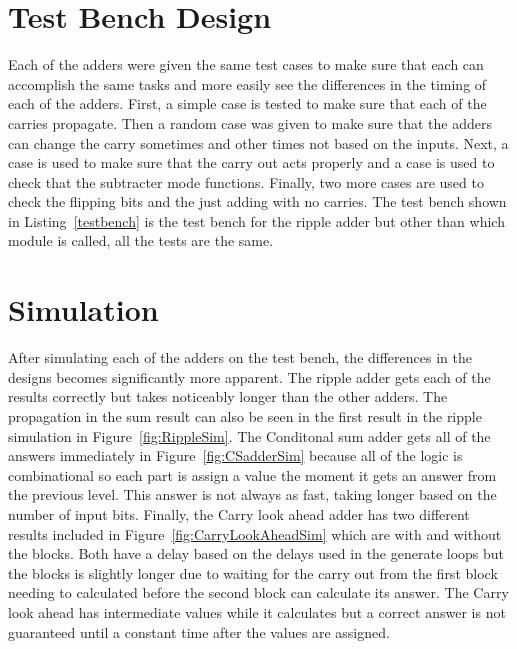 \documentclass{article}\usepackage{graphicx} %
\newcommand{\Verilog}[3]{
  \lstset{language=Verilog}
  \lstset{backgroundcolor=\color{listinggray},rulecolor=\color{blue}}
  \lstset{linewidth=\textwidth}
  \lstset{commentstyle=\textit, stringstyle=\upshape,showspaces=false}
  \lstset{frame=tb}
  
}
\begin{document}
\section{Test Bench Design}
Each of the adders were given the same test cases to make sure that each can accomplish the same tasks and more easily see the differences in the timing of each of the adders. First, a simple case is tested to make sure that each of the carries propagate. Then a random case was given to make sure that the adders can change the carry sometimes and other times not based on the inputs. Next, a case is used to make sure that the carry out acts properly and a case is used to check that the subtracter mode functions. Finally, two more cases are used to check the flipping bits and the just adding with no carries. The test bench shown in Listing~\ref{testbench} is the test bench for the ripple adder but other than which module is called, all the tests are the same.

\Verilog{Verilog code for the test benches.}{code:testbench}{../code/adder/ripple_test.v} 
\section{Simulation}
After simulating each of the adders on the test bench, the differences in the designs becomes significantly more apparent. The ripple adder gets each of the results correctly but takes noticeably longer than the other adders. The propagation in the sum result can also be seen in the first result in the ripple simulation in Figure~\ref{fig:RippleSim}. The Conditonal sum adder gets all of the answers immediately in Figure~\ref{fig:CSadderSim} because all of the logic is combinational so each part is assign a value the moment it gets an answer from the previous level. This answer is not always as fast, taking longer based on the number of input bits. Finally, the Carry look ahead adder has two different results included in Figure~\ref{fig:CarryLookAheadSim} which are with and without the blocks. Both have a delay based on the delays used in the generate loops but the blocks is slightly longer due to waiting for the carry out from the first block needing to calculated before the second block can calculate its answer. The Carry look ahead has intermediate values while it calculates but a correct answer is not guaranteed until a constant time after the values are assigned.
\end{document}
